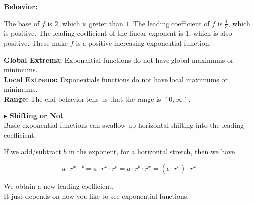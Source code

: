 \documentclass{ximera}
\begin{document}
\begin{example}
\begin{explanation}
\textbf{Behavior:} 

The base of $f$ is $2$, which is greter than $1$. The leading coefficient of $f$ is $\frac{1}{3}$, which is positive. The leading coefficient of the linear exponent is $1$, which is also positive.  These make $f$ is a positive increasing exponential function.



\textbf{Global Extrema:}  Exponential functions do not have global maximums or minimums. \\


\textbf{Local Extrema:}  Exponentials functions do not have local maximums or minimums. \\



\textbf{Range:} The end-behavior tells us that the range is $(0, \infty)$.



\end{explanation}

\end{example}

















$\blacktriangleright$ \textbf{\textcolor{blue!55!black}{Shifting or Not}} \\



Basic exponential functions can swallow up horizontal shifting into the leading coefficient.



If we add/subtract $b$ in the exponent, for a horizontal stretch, then we have

\[
a \cdot r^{x + b} = a \cdot r^x \cdot r^b = a \cdot r^b \cdot r^x = (a \cdot r^b) \cdot r^x
\]

We obtain a new leading coefficient. \\

It just depends on how you like to see exponential functions. \\
\end{document}
